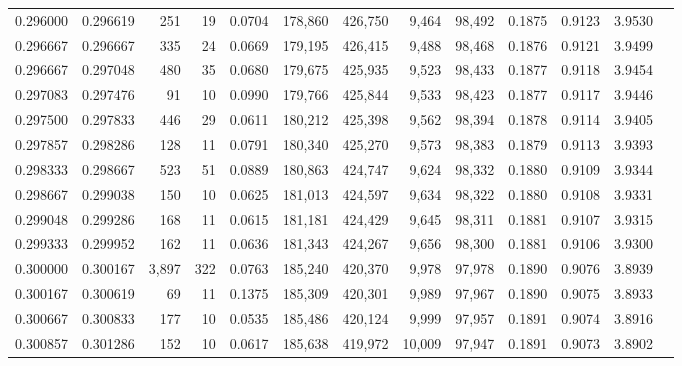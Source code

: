 \begin{tabular}{rrrrrrrrrrrrr}
0.296000 & 0.296619 &   251 &  19 &                                     0.0704 & 178,860 & 426,750 &   9,464 &  98,492 & 0.1875 & 0.9123 & 3.9530 \\
0.296667 & 0.296667 &   335 &  24 &                                     0.0669 & 179,195 & 426,415 &   9,488 &  98,468 & 0.1876 & 0.9121 & 3.9499 \\
0.296667 & 0.297048 &   480 &  35 &                                     0.0680 & 179,675 & 425,935 &   9,523 &  98,433 & 0.1877 & 0.9118 & 3.9454 \\
0.297083 & 0.297476 &    91 &  10 &                                     0.0990 & 179,766 & 425,844 &   9,533 &  98,423 & 0.1877 & 0.9117 & 3.9446 \\
0.297500 & 0.297833 &   446 &  29 &                                     0.0611 & 180,212 & 425,398 &   9,562 &  98,394 & 0.1878 & 0.9114 & 3.9405 \\
0.297857 & 0.298286 &   128 &  11 &                                     0.0791 & 180,340 & 425,270 &   9,573 &  98,383 & 0.1879 & 0.9113 & 3.9393 \\
0.298333 & 0.298667 &   523 &  51 &                                     0.0889 & 180,863 & 424,747 &   9,624 &  98,332 & 0.1880 & 0.9109 & 3.9344 \\
0.298667 & 0.299038 &   150 &  10 &                                     0.0625 & 181,013 & 424,597 &   9,634 &  98,322 & 0.1880 & 0.9108 & 3.9331 \\
0.299048 & 0.299286 &   168 &  11 &                                     0.0615 & 181,181 & 424,429 &   9,645 &  98,311 & 0.1881 & 0.9107 & 3.9315 \\
0.299333 & 0.299952 &   162 &  11 &                                     0.0636 & 181,343 & 424,267 &   9,656 &  98,300 & 0.1881 & 0.9106 & 3.9300 \\
0.300000 & 0.300167 & 3,897 & 322 &                                     0.0763 & 185,240 & 420,370 &   9,978 &  97,978 & 0.1890 & 0.9076 & 3.8939 \\
0.300167 & 0.300619 &    69 &  11 &                                     0.1375 & 185,309 & 420,301 &   9,989 &  97,967 & 0.1890 & 0.9075 & 3.8933 \\
0.300667 & 0.300833 &   177 &  10 &                                     0.0535 & 185,486 & 420,124 &   9,999 &  97,957 & 0.1891 & 0.9074 & 3.8916 \\
0.300857 & 0.301286 &   152 &  10 &                                     0.0617 & 185,638 & 419,972 &  10,009 &  97,947 & 0.1891 & 0.9073 & 3.8902 \\

\end{tabular}
